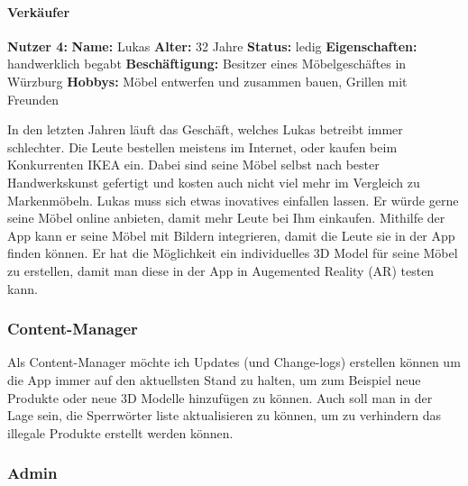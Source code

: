 \documentclass{scrartcl}
\begin{document}
\paragraph{Verkäufer} \mbox{} \newline

\noindent \textbf{Nutzer 4: \newline}
\textbf{Name:} Lukas \newline
\textbf{Alter:} 32 Jahre \newline 
\textbf{Status:} ledig \newline 
\textbf{Eigenschaften:} handwerklich begabt \newline
\textbf{Beschäftigung:} Besitzer eines Möbelgeschäftes in Würzburg \newline
\textbf{Hobbys:} Möbel entwerfen und zusammen bauen, Grillen mit Freunden \newline

\noindent In den letzten Jahren läuft das Geschäft, welches Lukas betreibt immer schlechter. Die Leute bestellen meistens im Internet, oder kaufen beim Konkurrenten IKEA ein.
Dabei sind seine Möbel selbst nach bester Handwerkskunst gefertigt und kosten auch nicht viel mehr im Vergleich zu Markenmöbeln. Lukas muss sich etwas inovatives einfallen lassen. Er würde gerne seine Möbel online anbieten, damit mehr Leute bei Ihm einkaufen. Mithilfe der App kann er seine Möbel mit Bildern integrieren, damit die Leute sie in der App finden können.
Er hat die Möglichkeit ein individuelles 3D Model für seine Möbel zu erstellen, damit man diese in der App in Augemented Reality (AR) testen kann. \newline 

\subsubsection{Content-Manager}

Als Content-Manager möchte ich Updates (und Change-logs) erstellen können um die App immer auf den aktuellsten Stand zu halten, um zum Beispiel neue Produkte oder neue 3D Modelle hinzufügen zu können.
Auch soll man in der Lage sein, die Sperrwörter liste aktualisieren zu können, um zu verhindern das illegale Produkte erstellt werden können. \newline 

\subsubsection{Admin}
\end{document}
